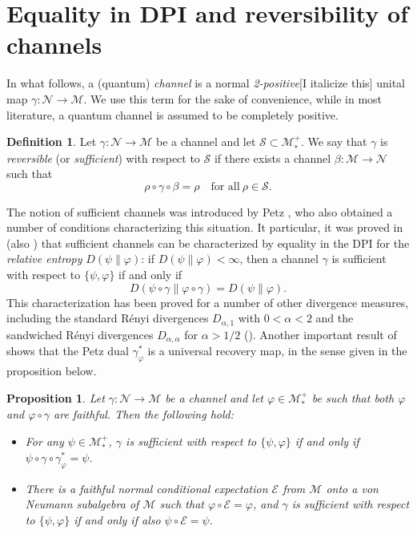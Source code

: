 \documentclass[12pt]{article}
\newtheorem{prop}[theorem]{Proposition}
\theoremstyle{definition}
\newtheorem{defi}[theorem]{Definition}
\theoremstyle{remark}
\numberwithin{equation}{section}
\def\Me{\mathcal M}
\def\Ne{\mathcal N}
\def\ffi{\varphi}
\begin{document}
\section{Equality in DPI and reversibility of channels}

In what follows, a (quantum) \emph{channel} is a normal \emph{2-positive}{\color{blue}[I italicize this]} unital
map $\gamma: \Ne\to \Me$. We use this term for the sake of convenience, while in most literature,
a quantum channel is assumed to be completely positive.

\begin{defi} Let $\gamma:\Ne\to \Me$ be a channel and let $\mathcal S \subset
\Me_*^+$. We say that $\gamma$ is \emph{reversible} (or \emph{sufficient}) with respect to
$\mathcal S$ if there exists a channel $\beta:\Me\to \Ne$ such that
\[
\rho\circ\gamma\circ\beta=\rho\quad\mbox{for all}\ \rho\in \mathcal S.
\]
\end{defi}

The notion of sufficient channels was introduced by Petz
\cite{petz1986sufficient,petz1988sufficiency}, who also obtained a number of conditions
characterizing this situation. It particular, it was proved in \cite{petz1988sufficiency}
{(also \cite{jencova2006sufficiency})} that sufficient channels can be characterized by
equality in the DPI for the \emph{relative entropy} $D(\psi\|\varphi)$: if $D(\psi\|\varphi)<\infty$,
then a channel $\gamma$ is sufficient with respect to $\{\psi,\varphi\}$ if and only if 
\[
D(\psi\circ\gamma\|\varphi\circ\gamma)=D(\psi\|\varphi). 
\]
This characterization has been proved for a number of other divergence measures, including the
standard R\'enyi divergences $D_{\alpha,1}$ with $0<\alpha<2$  and the sandwiched
R\'enyi divergences $D_{\alpha,\alpha}$ for $\alpha>1/2$
(\cite{hiai2021quantum,jencova2018renyi,jencova2021renyi}).
Another important result of \cite{petz1988sufficiency} shows that the Petz dual $\gamma_\varphi^*$
is a universal recovery map, in the sense given in the proposition below. 

\begin{prop}\label{prop:universal}
Let $\gamma:\Ne\to \Me$ be a channel and let $\varphi\in \Me_*^+$ be such that both $\ffi$ and
$\ffi\circ\gamma$ are faithful. Then the following hold:
\begin{itemize}
\item[(i)] For any $\psi\in \Me_*^+$, $\gamma$ is sufficient with respect to $\{\psi,\varphi\}$ if and only
if $\psi\circ\gamma\circ\gamma_\varphi^*=\psi$.

\item[(ii)]
There is a faithful normal conditional expectation $\mathcal E$ from $\Me$ onto a von Neumann
subalgebra of $\Me$ such that $\varphi\circ \mathcal E=\varphi$, and $\gamma$ is sufficient with
respect to $\{\psi,\varphi\}$ if and only if also $\psi\circ\mathcal E=\psi$.
\end{itemize}
\end{prop}
\end{document}
